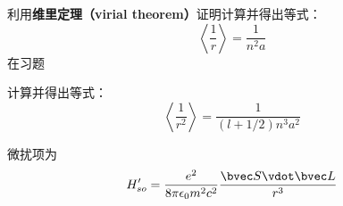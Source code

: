 \begin{exercise}{}\label{HfineS_exe1}
利用\textbf{维里定理（virial theorem）}证明计算并得出等式：
\begin{equation}
\left\langle\frac{1}{r}\right\rangle = \frac{1}{n^2a}
\end{equation}
在习题
\end{exercise}
\begin{exercise}{}\label{HfineS_exe2}
计算并得出等式：
\begin{equation}
\left\langle \frac{1}{r^2}\right\rangle = \frac{1}{(l+1/2)n^3a^2}
\end{equation}
\end{exercise}
微扰项为
\begin{equation}
H'_{so} = \frac{e^2}{8\pi \epsilon_0 m^2 c^2} \frac{\bvec S \vdot \bvec L}{r^3}
\end{equation}
